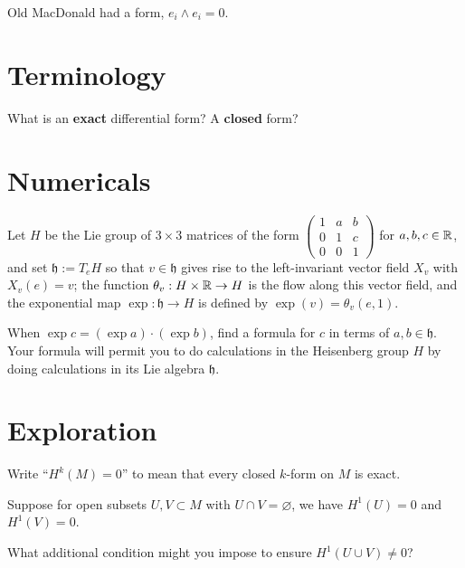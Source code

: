 \documentclass{homework}
\author{Jim Fowler}
\begin{document}
\maketitle

\begin{inspiration}
  Old MacDonald had a form, $e_i \wedge e_i = 0$. 
\end{inspiration}

\section{Terminology}

\begin{problem}
  What is an \textbf{exact} differential form?  A \textbf{closed} form?
\end{problem}

\section{Numericals}

\begin{problem} Let $H$ be the Lie group of $3 \times 3$ matrices of
the form 
  $\displaystyle\begin{pmatrix}
    1 & a & b \\
    0 & 1 & c \\
    0 & 0 & 1
  \end{pmatrix}$ for $a, b, c \in \mathbb{R}$, and set $\mathfrak{h} := T_e H$
so that $v \in \mathfrak{h}$ gives rise to the left-invariant vector
field $X_v$ with $X_v(e) = v$; the function $\theta_{v} : H \times \mathbb{R}
\to H$ is the flow along this vector field, and the exponential map
$\exp : \mathfrak{h} \to H$ is defined by $\exp(v) = \theta_v(e,1)$.

When $\exp c = (\exp a) \cdot (\exp b)$, find a formula for $c$ in
terms of $a, b \in \mathfrak{h}$.  Your formula will permit you to do
calculations in the Heisenberg group $H$ by doing calculations in its Lie
algebra $\mathfrak{h}$.
\end{problem}

\section{Exploration}

\begin{problem}
Write ``$H^k(M) = 0$'' to mean that every closed $k$-form on $M$ is exact.

  Suppose for open subsets $U, V \subset M$ with $U \cap V =
  \varnothing$, we have $H^1(U) = 0$ and $H^1(V) = 0$.

  What additional condition might you impose to ensure $H^1(U \cup V)
\neq 0$?
\end{problem}
\end{document}
